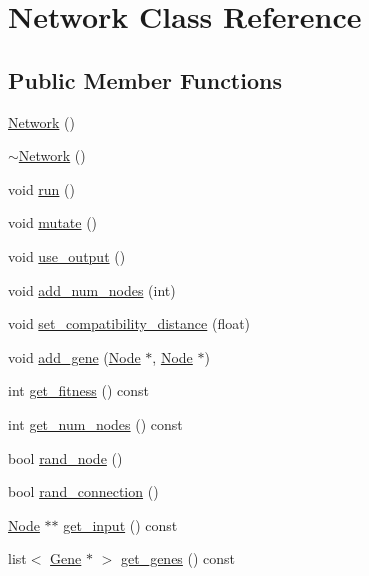 \hypertarget{classNetwork}{}\section{Network Class Reference}
\label{classNetwork}
\subsection*{Public Member Functions}
\begin{DoxyCompactItemize}
\item 
\hyperlink{classNetwork_a3cc2fb4f8fa4d507077e8da85ce5a1c8}{Network} ()
\item 
\hyperlink{classNetwork_a7a4e19cdb4bf0c7ecf82baa643831492}{$\sim$\+Network} ()
\item 
void \hyperlink{classNetwork_acc13a2e54ee332bb9f288f953ae141ed}{run} ()
\item 
void \hyperlink{classNetwork_aee08409aeb49afa57118ecd46fe78860}{mutate} ()
\item 
void \hyperlink{classNetwork_a7ed4519d18b5a0ef1609c0bcb5293eac}{use\+\_\+output} ()
\item 
void \hyperlink{classNetwork_a4a5894f93aa47d4a39f3709d1f828758}{add\+\_\+num\+\_\+nodes} (int)
\item 
void \hyperlink{classNetwork_a05aacf7dc8b0a5f5ad450a8967a23bcd}{set\+\_\+compatibility\+\_\+distance} (float)
\item 
void \hyperlink{classNetwork_a3e94eace0d502e87c88bc33cac84cfc4}{add\+\_\+gene} (\hyperlink{classNode}{Node} $\ast$, \hyperlink{classNode}{Node} $\ast$)
\item 
int \hyperlink{classNetwork_a1dc09e49b864fdd2cf44530b765c924b}{get\+\_\+fitness} () const 
\item 
int \hyperlink{classNetwork_afaeeda0548935cc3da97b1978884c851}{get\+\_\+num\+\_\+nodes} () const 
\item 
bool \hyperlink{classNetwork_a29676c0b42a6123b441e7f1fcba522b4}{rand\+\_\+node} ()
\item 
bool \hyperlink{classNetwork_a5f85af3cb52fcab5b15b226496686e77}{rand\+\_\+connection} ()
\item 
\hyperlink{classNode}{Node} $\ast$$\ast$ \hyperlink{classNetwork_a40d0e94071662469e6cacafbd6f42f07}{get\+\_\+input} () const 
\item 
list$<$ \hyperlink{classGene}{Gene} $\ast$ $>$ \hyperlink{classNetwork_aa55b25f282057ae47e0de0eeea39445f}{get\+\_\+genes} () const 
\end{DoxyCompactItemize}
